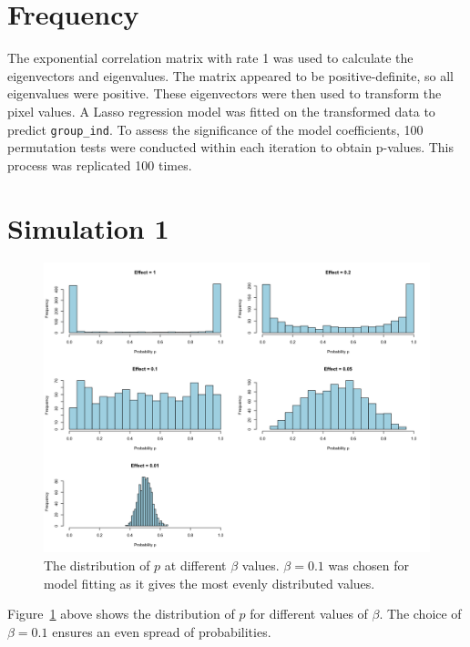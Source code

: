 \documentclass[12pt]{article}
\begin{document}
\section*{Frequency}

The exponential correlation matrix with rate 1 was used to calculate the eigenvectors and eigenvalues. The matrix appeared to be positive-definite, so all eigenvalues were positive. These eigenvectors were then used to transform the pixel values. A Lasso regression model was fitted on the transformed data to predict \texttt{group\_ind}. To assess the significance of the model coefficients, 100 permutation tests were conducted within each iteration to obtain p-values. This process was replicated 100 times.

\clearpage

\section*{Simulation 1}




\begin{figure}[H]
    \centering
    \includegraphics[width=\textwidth]{../Figures/sim1_p_dist.png}
    \caption{The distribution of \(p\) at different \(\beta\) values. \(\beta = 0.1\) was chosen for model fitting as it gives the most evenly distributed values.}
    \label{fig:sim1_p_dist}
\end{figure}

Figure~\ref{fig:sim1_p_dist} above shows the distribution of \(p\) for different values of \(\beta\). The choice of \(\beta = 0.1\) ensures an even spread of probabilities.
\end{document}
